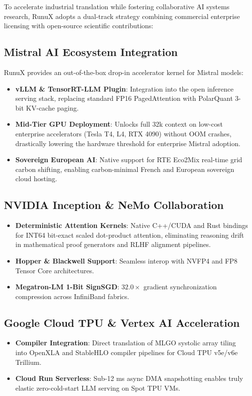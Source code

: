 \documentclass[10pt,twocolumn]{article}
\begin{document}
To accelerate industrial translation while fostering collaborative AI systems research, RunuX adopts a dual-track strategy combining commercial enterprise licensing with open-source scientific contributions:

\subsection{Mistral AI Ecosystem Integration}
RunuX provides an out-of-the-box drop-in accelerator kernel for Mistral models:
\begin{itemize}
    \item \textbf{vLLM \& TensorRT-LLM Plugin}: Integration into the open inference serving stack, replacing standard FP16 PagedAttention with PolarQuant 3-bit KV-cache paging.
    \item \textbf{Mid-Tier GPU Deployment}: Unlocks full 32k context on low-cost enterprise accelerators (Tesla T4, L4, RTX 4090) without OOM crashes, drastically lowering the hardware threshold for enterprise Mistral adoption.
    \item \textbf{Sovereign European AI}: Native support for RTE Eco2Mix real-time grid carbon shifting, enabling carbon-minimal French and European sovereign cloud hosting.
\end{itemize}

\subsection{NVIDIA Inception \& NeMo Collaboration}
\begin{itemize}
    \item \textbf{Deterministic Attention Kernels}: Native C++/CUDA and Rust bindings for INT64 bit-exact scaled dot-product attention, eliminating reasoning drift in mathematical proof generators and RLHF alignment pipelines.
    \item \textbf{Hopper \& Blackwell Support}: Seamless interop with NVFP4 and FP8 Tensor Core architectures.
    \item \textbf{Megatron-LM 1-Bit SignSGD}: $32.0\times$ gradient synchronization compression across InfiniBand fabrics.
\end{itemize}

\subsection{Google Cloud TPU \& Vertex AI Acceleration}
\begin{itemize}
    \item \textbf{Compiler Integration}: Direct translation of MLGO systolic array tiling into OpenXLA and StableHLO compiler pipelines for Cloud TPU v5e/v6e Trillium.
    \item \textbf{Cloud Run Serverless}: Sub-12 ms async DMA snapshotting enables truly elastic zero-cold-start LLM serving on Spot TPU VMs.
\end{itemize}
\end{document}
